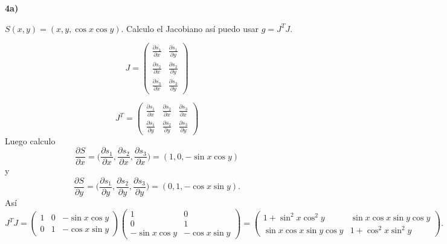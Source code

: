 \documentclass[11pt,spanish]{article}
\begin{document}
\vspace{0.5cm}
{\bf 4a)}
\vspace{0.5cm}

$S(x,y) = (x,y,\cos x\cos y)$. Calculo el Jacobiano as\'i puedo usar $g=J^TJ$.

$$
J
=
\begin{pmatrix}
\frac{\partial s_1}{\partial x} & \frac{\partial s_1}{\partial y} \\
\frac{\partial s_2}{\partial x} & \frac{\partial s_2}{\partial y} \\
\frac{\partial s_3}{\partial x} & \frac{\partial s_3}{\partial y}
\end{pmatrix}
$$

$$
J^T
=
\begin{pmatrix}
\frac{\partial s_1}{\partial x} & \frac{\partial s_2}{\partial x} & \frac{\partial s_3}{\partial x}  \\
\frac{\partial s_1}{\partial y} & \frac{\partial s_2}{\partial y} & \frac{\partial s_3}{\partial y} 
\end{pmatrix}
$$
Luego calculo
$$
\frac{\partial S}{\partial x}
=
\bigg(
\frac{\partial s_1}{\partial x},
\frac{\partial s_2}{\partial x},
\frac{\partial s_3}{\partial x}
\bigg)
=
(1,0,-\sin x\cos y)
$$
y
$$
\frac{\partial S}{\partial y}
=
\bigg(
\frac{\partial s_1}{\partial y},
\frac{\partial s_2}{\partial y},
\frac{\partial s_3}{\partial y}
\bigg)
=
(0,1,-\cos x\sin y)
.
$$
As\'i
$$
J^TJ
=
\begin{pmatrix}
1 & 0 & -\sin x\cos y \\
0 & 1 & -\cos x\sin y
\end{pmatrix}
\begin{pmatrix}
1 & 0 \\
0 & 1 \\
-\sin x\cos y & -\cos x\sin y
\end{pmatrix}
=
\begin{pmatrix}
1+\sin^2 x\cos^2 y & \sin x\cos x \sin y\cos y \\
\sin x\cos x \sin y\cos y & 1 + \cos^2 x\sin^2 y
\end{pmatrix}
.
$$
\end{document}

